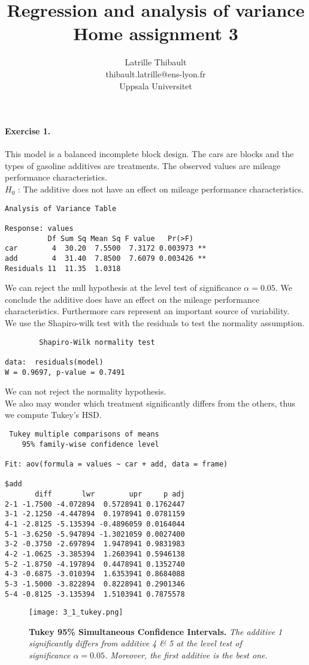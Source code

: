 \documentclass{article}
\author{Latrille Thibault\\
\small thibault.latrille@ens-lyon.fr\\[-0.8ex]
\small Uppsala Universitet\\}
\title{Regression and analysis of variance \\ Home assignment 3}
\begin{document}
\maketitle
\paragraph{Exercise 1.}


This model is a balanced incomplete block design. The cars are blocks and the types of gasoline additives are treatments.
The observed values are mileage performance characteristics.\\
$H_0$ : The additive does not have an effect on mileage performance characteristics.
\begin{verbatim}
Analysis of Variance Table

Response: values
          Df Sum Sq Mean Sq F value   Pr(>F)   
car        4  30.20  7.5500  7.3172 0.003973 **
add        4  31.40  7.8500  7.6079 0.003426 **
Residuals 11  11.35  1.0318                      
\end{verbatim}
We can reject the null hypothesis at the level test of significance $\alpha=0.05$. We conclude the additive does have an effect on the mileage performance characteristics. Furthermore cars represent an important source of variability.\\
We use the Shapiro-wilk test with the residuals to test the normality assumption.
\begin{verbatim}
        Shapiro-Wilk normality test

data:  residuals(model) 
W = 0.9697, p-value = 0.7491
\end{verbatim}
We can not reject the normality hypothesis. \\
We also may wonder which treatment significantly differs from the others, thus we compute Tukey's HSD.
\begin{footnotesize}
	\begin{verbatim}
 Tukey multiple comparisons of means
    95% family-wise confidence level

Fit: aov(formula = values ~ car + add, data = frame)

$add
       diff       lwr        upr     p adj
2-1 -1.7500 -4.072894  0.5728941 0.1762447
3-1 -2.1250 -4.447894  0.1978941 0.0781159
4-1 -2.8125 -5.135394 -0.4896059 0.0164044
5-1 -3.6250 -5.947894 -1.3021059 0.0027400
3-2 -0.3750 -2.697894  1.9478941 0.9831983
4-2 -1.0625 -3.385394  1.2603941 0.5946138
5-2 -1.8750 -4.197894  0.4478941 0.1352740
4-3 -0.6875 -3.010394  1.6353941 0.8684088
5-3 -1.5000 -3.822894  0.8228941 0.2901346
5-4 -0.8125 -3.135394  1.5103941 0.7875578
\end{verbatim}
\end{footnotesize}
\begin{figure}[H]
	  \centering
  	\texttt{[image: 3\_1\_tukey.png]}
  	\caption{\textbf{Tukey 95\% Simultaneous Confidence Intervals.} \textsl{The additive 1 significantly differs from additive 4 \& 5 at the level test of significance $\alpha=0.05$. Moreover, the first additive is the best one.}
  	}
	\end{figure} 
\end{document}
